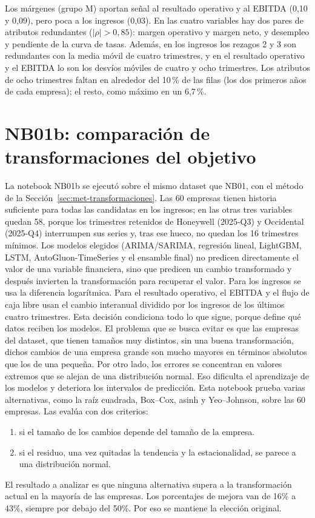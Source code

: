 \documentclass[12pt,letterpaper,oneside]{report}
\renewcommand{\_}{\UnderscoreOriginal\allowbreak}
\begin{document}
Los márgenes (grupo M) aportan señal al resultado operativo y al EBITDA (0,10 y 0,09), pero poca a los ingresos (0,03). En las cuatro variables hay dos pares de atributos redundantes ($|\rho| > 0{,}85$): margen operativo y margen neto, y desempleo y pendiente de la curva de tasas. Además, en los ingresos los rezagos 2 y 3 son redundantes con la media móvil de cuatro trimestres, y en el resultado operativo y el EBITDA lo son los desvíos móviles de cuatro y ocho trimestres. Los atributos de ocho trimestres faltan en alrededor del 10\,\% de las filas (los dos primeros años de cada empresa); el resto, como máximo en un 6,7\,\%.

\section{NB01b: comparación de transformaciones del objetivo}
\label{sec:res-nb01b}

La notebook NB01b se ejecutó sobre el mismo dataset que NB01, con el método de la Sección~\ref{sec:met-transformaciones}. Las 60 empresas tienen historia suficiente para todas las candidatas en los ingresos; en las otras tres variables quedan 58, porque los trimestres retenidos de Honeywell (2025-Q3) y Occidental (2025-Q4) interrumpen sus series y, tras ese hueco, no quedan los 16 trimestres mínimos.
Los modelos elegidos (ARIMA/SARIMA, regresión lineal, LightGBM, LSTM, AutoGluon-TimeSeries y el ensamble final) no predicen directamente el valor de una variable financiera, sino que predicen un cambio transformado y después invierten la transformación para recuperar el valor.
Para los ingresos se usa la diferencia logarítmica. Para el resultado operativo, el EBITDA y el flujo de caja libre usan el cambio interanual dividido por los ingresos de los últimos cuatro trimestres. Esta decisión condiciona todo lo que sigue, porque define qué datos reciben los modelos.
El problema que se busca evitar es que las empresas del dataset, que tienen tamaños muy distintos, sin una buena transformación, dichos cambios de una empresa grande son mucho mayores en términos absolutos que los de una pequeña.
Por otro lado, los errores se concentran en valores extremos que se alejan de una distribución normal. Eso dificulta el aprendizaje de los modelos y deteriora los intervalos de predicción. Esta notebook prueba varias alternativas, como la raíz cuadrada, Box–Cox, asinh y Yeo–Johnson, sobre las 60 empresas.
Las evalúa con dos criterios: 
\begin{enumerate}
\item si el tamaño de los cambios depende del tamaño de la empresa.
\item si el residuo, una vez quitadas la tendencia y la estacionalidad, se parece a una distribución normal.
\end{enumerate}
El resultado a analizar es que ninguna alternativa supera a la transformación actual en la mayoría de las empresas.
Los porcentajes de mejora van de 16\% a 43\%, siempre por debajo del 50\%. Por eso se mantiene la elección original.
\end{document}
